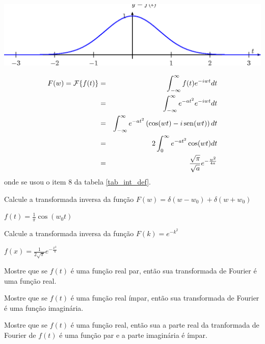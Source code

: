 \begin{Answer}
\begin{center}

\includegraphics{cap_transformada_de_fourier/pics/figura_9}\end{center}
\begin{eqnarray*}
F(w)=\mathcal{F}\{f(t)\}&=&\int_{-\infty}^\infty f(t) e^{-i w t}dt\\
&=&\int_{-\infty}^\infty e^{-at^2} e^{-i w t}dt\\
&=&\int_{-\infty}^\infty e^{-at^2} \left(\cos(wt)-i\operatorname{sen}(wt)\right)dt\\
&=&2\int_{0}^\infty e^{-at^2} \cos(wt)dt\\
&=&\frac{\sqrt{\pi}}{\sqrt{a}}e^{-\frac{w^2}{4a}}
\end{eqnarray*}
onde se usou o item 8 da tabela \ref{tab_int_def}.
\end{Answer}
\begin{Exercise} {\label{ex_trans_Fou_0}}Calcule a transformada inversa da função $F(w)=\delta(w-w_0)+\delta(w+w_0)$
\end{Exercise}
\begin{Answer} $f(t)=\frac{1}{\pi}\cos(w_0t)$
\end{Answer}
\begin{Exercise}{\label{ex_inv_exp_kk}} Calcule a transformada inversa da função $F(k)=e^{-k^2}$
\end{Exercise}
\begin{Answer} $f(x)=\frac{1}{2\sqrt{\pi}} e^{-\frac{x^2}{4}}$
\end{Answer}
\begin{Exercise} Mostre que se $f(t)$ é uma função real par, então sua transformada de Fourier é uma função real.
\end{Exercise}
\begin{Exercise} Mostre que se $f(t)$ é uma função real ímpar, então sua transformada de Fourier é uma função imaginária.
\end{Exercise}
\begin{Exercise} Mostre que se $f(t)$ é uma função real, então sua a parte real da tranformada de Fourier de $f(t)$ é uma função par e a parte imaginária é ímpar.
\end{Exercise}

